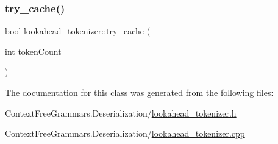 \subsubsection{\texorpdfstring{try\_cache()}{try\_cache()}}
{\footnotesize\ttfamily bool lookahead\+\_\+tokenizer\+::try\+\_\+cache (\begin{DoxyParamCaption}\item[{int}]{token\+Count }\end{DoxyParamCaption})}



The documentation for this class was generated from the following files\+:\begin{DoxyCompactItemize}
\item 
Context\+Free\+Grammars.\+Deserialization/\mbox{\hyperlink{lookahead__tokenizer_8h}{lookahead\+\_\+tokenizer.\+h}}\item 
Context\+Free\+Grammars.\+Deserialization/\mbox{\hyperlink{lookahead__tokenizer_8cpp}{lookahead\+\_\+tokenizer.\+cpp}}\end{DoxyCompactItemize}
